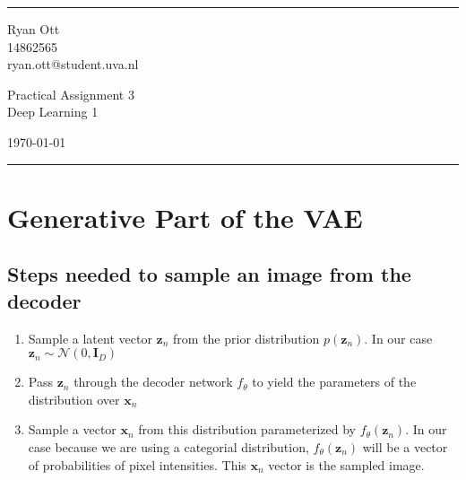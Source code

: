 \documentclass[a4paper]{article}
\begin{document}

\fancyhead[C]{}
\hrule \medskip %
\begin{minipage}{0.295\linewidth} 
\raggedright
\footnotesize
Ryan Ott \hfill\\   
14862565 \hfill\\
ryan.ott@student.uva.nl
\end{minipage}
\begin{minipage}{0.4\linewidth} 
\centering 
\large 
Practical Assignment 3\\ 
\normalsize 
Deep Learning 1\\ 
\end{minipage}
\begin{minipage}{0.295\linewidth} 
\raggedleft
\today\hfill\\
\end{minipage}
\medskip\hrule 
\bigskip

\section{Generative Part of the VAE}
\subsection{Steps needed to sample an image from the decoder}
\begin{enumerate}
    \item Sample a latent vector $\bm{z}_n$ from the prior distribution $p(\bm{z}_n)$. In our case $\bm{z}_n \sim \mathcal{N}(0,
    \bm{I}_D)$
    \item Pass $\bm{z}_n$ through the decoder network $f_{\theta}$ to yield the parameters of the distribution over $\bm{x}_n$
    \item Sample a vector $\bm{x}_n$ from this distribution parameterized by $f_{\theta}(\bm{z}_n)$. In our case because we are using a
    categorial distribution, $f_{\theta}(\bm{z}_n)$ will be a vector of probabilities of pixel intensities. This $\bm{x}_n$ vector is
    the sampled image.
\end{enumerate}
\end{document}
